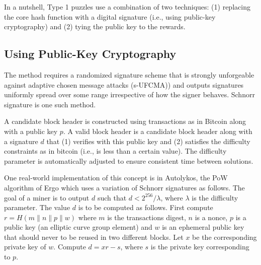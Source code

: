 \documentclass[11pt]{article}
\newcommand{\authnote}[2]{\marginpar{\parbox{\marginparwidth}{\tiny %
  \textsf{#1 {\textcolor{blue}{notes: #2}}}}}%
  \textcolor{blue}{\textbf{\dag}}}
\newcommand{\authnote}[2]{
  \textsf{#1 \textcolor{blue}{: #2}}}
\newcommand{\authnote}[2]{}
\newcommand{\snote}[1]{{\authnote{\textcolor{red}{Scalahub notes}}{#1}}}
\newcommand{\powname}{Autolykos\xspace}
\begin{document}

In a nutshell, Type 1 puzzles use a combination of two techniques: (1) replacing the core hash function with a digital signature (i.e., using public-key cryptography) and (2) tying the public key to the rewards.

\subsection{Using Public-Key Cryptography}

The method requires a randomized signature scheme that is strongly unforgeable against adaptive chosen message attacks (s-UFCMA)) and outputs signatures uniformly spread over some range irrespective of how the signer behaves. Schnorr signature is one such method.

A candidate block header is constructed using transactions as in Bitcoin along with a public key $p$. A valid block header is a candidate block header along with a signature $d$ that (1) verifies with this public key and (2) satisfies the difficulty constraints as in bitcoin (i.e., is less than a certain value). The difficulty parameter is automatically adjusted to ensure consistent time between solutions.

One real-world implementation of this concept is in \powname, the PoW algorithm of Ergo which uses a variation of Schnorr signatures as follows. The goal of a miner is to output $d$ such that $d < 2^{256}/\lambda$, where $\lambda$ is the difficulty parameter. The value $d$ is to be computed as follows. First compute $r = H(m\|n\|p\|w)$ where $m$ is the transactions digest, $n$ is a nonce, $p$ is a public key (an elliptic curve group element) and $w$ is an ephemeral public key that should never to be reused in two different blocks. Let $x$ be the corresponding private key of $w$. Compute $d = xr - s$, where $s$ is the private key corresponding to $p$.


\end{document}
